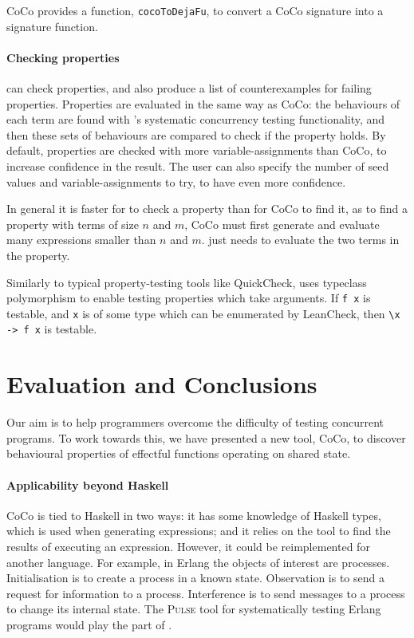 CoCo provides a function, \texttt{cocoToDejaFu}, to convert a CoCo
signature into a \dejafu{} signature function.

\paragraph{Checking properties}
\dejafu{} can check properties, and also produce a list of
counterexamples for failing properties.  Properties are evaluated in
the same way as CoCo: the behaviours of each term are found with
\dejafu{}'s systematic concurrency testing functionality, and then
these sets of behaviours are compared to check if the property holds.
By default, properties are checked with more variable-assignments than
CoCo, to increase confidence in the result.  The user can also specify
the number of seed values and variable-assignments to try, to have
even more confidence.

In general it is faster for \dejafu{} to check a property than for
CoCo to find it, as to find a property with terms of size $n$ and $m$,
CoCo must first generate and evaluate many expressions smaller than
$n$ and $m$.  \dejafu{} just needs to evaluate the two terms in the
property.

Similarly to typical property-testing tools like
QuickCheck\cite{claessen2000}, \dejafu{} uses typeclass polymorphism
to enable testing properties which take arguments.  If \texttt{f x} is
testable, and \texttt{x} is of some type which can be enumerated by
LeanCheck, then \verb|\x -> f x| is testable.

\section{Evaluation and Conclusions}
\label{sec:coco-conclusions}

Our aim is to help programmers overcome the difficulty of testing
concurrent programs.  To work towards this, we have presented a new
tool, CoCo, to discover behavioural properties of effectful functions
operating on shared state.

\paragraph{Applicability beyond Haskell}
CoCo is tied to Haskell in two ways: it has some knowledge of Haskell
types, which is used when generating expressions; and it relies on the
\dejafu{} tool to find the results of executing an expression.
However, it could be reimplemented for another language.  For example,
in Erlang the objects of interest are processes.  Initialisation is to
create a process in a known state.  Observation is to send a request
for information to a process.  Interference is to send messages to a
process to change its internal state.  The \textsc{Pulse} tool for
systematically testing Erlang programs\cite{claessen2009} would play
the part of \dejafu{}.

